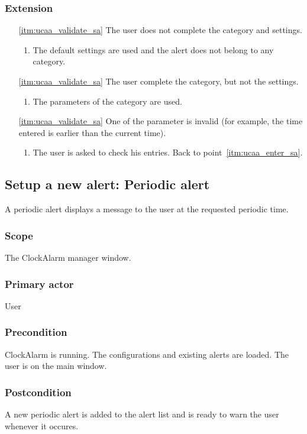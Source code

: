 \subsubsection{Extension}
\begin{enumerate}
	\item[\ref{itm:ucaa_validate_sa}] The user does not complete the category and settings.
	\begin{enumerate}[i]
		\item The default settings are used and the alert does not belong to any category.
	\end{enumerate}
	\item[\ref{itm:ucaa_validate_sa}] The user complete the category, but not the settings.
	\begin{enumerate}[i]
		\item The parameters of the category are used.
	\end{enumerate}
	\item[\ref{itm:ucaa_validate_sa}] One of the parameter is invalid (for example, the time entered is earlier than the current time).
	\begin{enumerate}[i]
		\item The user is asked to check his entries. Back to point~\ref{itm:ucaa_enter_sa}.
	\end{enumerate}
\end{enumerate}

\subsection{Setup a new alert: Periodic alert}
A periodic alert displays a message to the user at the requested periodic time.
\subsubsection{Scope}
The ClockAlarm manager window.
\subsubsection{Primary actor}
User
\subsubsection{Precondition}
ClockAlarm is running. The configurations and existing alerts are loaded. The user is on the main window.
\subsubsection{Postcondition}
A new periodic alert is added to the alert list and is ready to warn the user whenever it occures.
